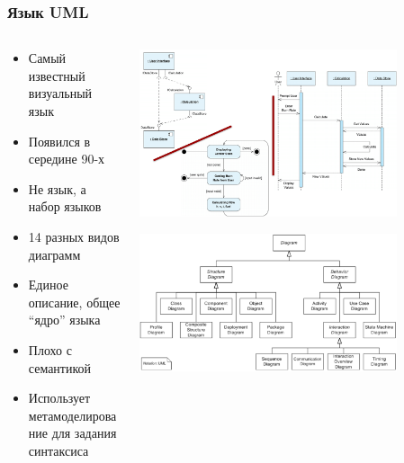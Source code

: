 \documentclass[xetex,mathserif,serif]{beamer}
\begin{document}
	\begin{frame}
		\frametitle{Язык UML}
		\begin{columns}
			\begin{column}{0.45\textwidth}
				\begin{itemize}
					\item Самый известный визуальный язык
					\item Появился в середине 90-х
					\item Не язык, а набор языков
					\item 14 разных видов диаграмм
					\item Единое описание, общее ``ядро'' языка
					\item Плохо с семантикой
					\item Использует метамоделирование для задания синтаксиса
				\end{itemize}
			\end{column}
			\begin{column}{0.55\textwidth}
				\begin{center}
					\includegraphics[width=0.8\textwidth]{uml.png}
					
					\vspace{5mm}
					
					\includegraphics[width=0.8\textwidth]{umlDiagrams.png}
				\end{center}
			\end{column}
		\end{columns}
	\end{frame}
\end{document}
